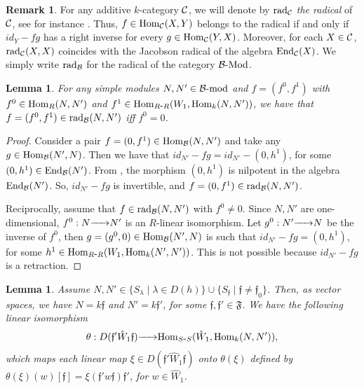 \documentclass{article}
\newtheorem{lemma}[theorem]{Lemma}
\theoremstyle{definition}
\newtheorem{remark}[theorem]{Remark}
\newcommand{\End}{{ \rm End }}
\newcommand{\Hom}{{ \rm Hom }}
\newcommand{\Mod}{{ \rm Mod }}
\newcommand{\rad}{{ \rm rad }}
\renewcommand{\frak}{\mathfrak}
\newcommand{\g}{\hbox{-}}
\renewcommand{\mod}{{\rm mod }}
\newcommand{\rightmap}[1]{\smash{\mathop{\hbox to 
20pt{\rightarrowfill}}\limits^{#1}}}
\begin{document}
\begin{remark}\label{R: el radical} For any additive $k$-category ${\cal C}$, 
we will denote by $\rad_{\cal C}$ \emph{the radical} of  ${\cal C}$, see for instance \cite[(2.10)]{Kr}. Thus, 
$f \in \Hom_{\cal C}(X,Y)$  belongs to the radical if and only if $id_Y - fg$ has a right inverse for every $g \in \Hom_{\cal C}(Y, X)$. Moreover, for each $X\in {\cal C}$, $\rad_{\cal C}(X,X)$ coincides with the Jacobson radical of the algebra $\End_{\cal C}(X)$.  We simply write $\rad_{\cal B}$ for the radical of the category ${\cal B}\g\Mod$. 
\end{remark}

\begin{lemma}\label{L: descripcion de rad(N,N')}
For any simple modules $N,N'\in {\cal B}\g\mod$ and $f=(f^0,f^1)$ with $f^0\in \Hom_R(N,N')$ and $f^1\in \Hom_{R\g R}(W_1,\Hom_k(N,N'))$, we have that   $f=(f^0,f^1)\in \rad_{\cal B}(N,N')$ iff $f^0=0$. 
\end{lemma}

\begin{proof}  Consider a pair $f=(0,f^1)\in \Hom_{\cal B}(N,N')$ and take any $g\in \Hom_{\cal B}(N',N)$. Then we have that $id_{N'}-fg=id_{N'}-(0,h^1)$, for some $(0,h^1)\in\End_{\cal B}(N')$. From \cite[(5.4)]{BSZ}, the morphism $(0,h^1)$ is nilpotent in the algebra $\End_{\cal B}(N')$. So,  $id_{N'}-fg$ is invertible, and $f=(0,f^1)\in \rad_{\cal B}(N,N')$. 
 
Reciprocally, assume that $f\in \rad_{\cal B}(N,N')$ with $f^0\not=0$. Since $N,N'$ are 
one-dimensional,  $f^0:N\rightmap{}N'$ is an $R$-linear isomorphism. Let $g^0:N'\rightmap{}N$ be the inverse of $f^0$, then $g=(g^0,0)\in \Hom_{\cal B}(N',N)$ is such that $id_{N'}- fg=(0,h^1)$, for some $h^1\in \Hom_{R\g R}(W_1,\Hom_k(N',N'))$. This  is not possible because  $id_{N'}-fg$ is a retraction. 
\end{proof}



\begin{lemma}\label{L: para construir morfismos entre simples} Assume $N,N'\in \{S_\lambda\mid \lambda\in D(h)\}\cup \{S_{\frak{f}}\mid \frak{f}\not=\frak{f}_0\}$. Then,  as vector spaces, we have $N=k\frak{f}$ and $N'=k\frak{f}'$, for some  $\frak{f},\frak{f}'\in \frak{F}$. 
We have  the following  linear isomorphism 
$$\theta:D(\frak{f}'\hat{W}_1\frak{f})\rightmap{}\Hom_{S\g S}(\hat{W}_1,\Hom_k(N,N')),$$
which maps each linear map $\xi\in D(\frak{f}'\hat{W}_1\frak{f})$ onto $\theta(\xi)$ defined by $\theta(\xi)(w)[\frak{f}]=\xi(\frak{f}'w\frak{f})\frak{f}'$, for $w\in \hat{W}_1$. 
\end{lemma}
\end{document}
